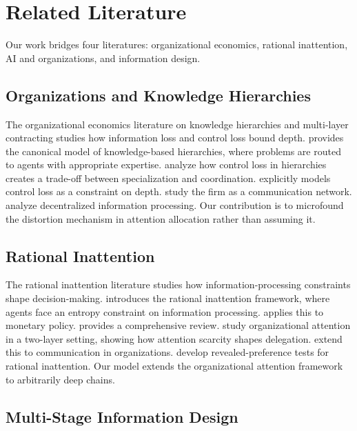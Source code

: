 \section{Related Literature}
\label{sec:literature}

Our work bridges four literatures: organizational economics, rational inattention, AI and organizations, and information design.

\subsection{Organizations and Knowledge Hierarchies}

The organizational economics literature on knowledge hierarchies and multi-layer contracting studies how information loss and control loss bound depth. \citet{garicano2000hierarchies} provides the canonical model of knowledge-based hierarchies, where problems are routed to agents with appropriate expertise. \citet{melumad1995hierarchical} analyze how control loss in hierarchies creates a trade-off between specialization and coordination. \citet{lash2008information} explicitly models control loss as a constraint on depth. \citet{bolton1994firm} study the firm as a communication network. \citet{radner1993organization} analyze decentralized information processing. Our contribution is to microfound the distortion mechanism in attention allocation rather than assuming it.

\subsection{Rational Inattention}

The rational inattention literature studies how information-processing constraints shape decision-making. \citet{sims2003implications} introduces the rational inattention framework, where agents face an entropy constraint on information processing. \citet{sims2006rational} applies this to monetary policy. \citet{mackowiak2023rational} provides a comprehensive review. \citet{dessein2006adaptive} study organizational attention in a two-layer setting, showing how attention scarcity shapes delegation. \citet{dessein2016rational} extend this to communication in organizations. \citet{caplin2015revealed} develop revealed-preference tests for rational inattention. Our model extends the organizational attention framework to arbitrarily deep chains.

\subsection{Multi-Stage Information Design}

